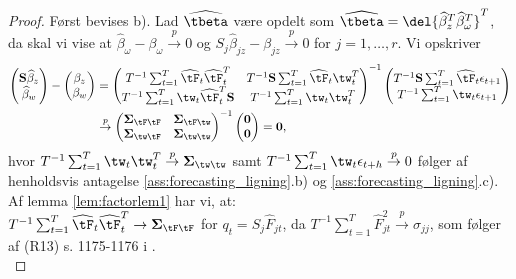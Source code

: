 \begin{proof}
Først bevises b). 
Lad \(\widehat{\tbeta}\) være opdelt som \(\widehat{\tbeta} = \del{\widehat{\beta}_z^T \widehat{\beta}_\omega^T}^T\), da skal vi vise at \(\widehat{\beta}_\omega - \beta_\omega \overset{p}{\rightarrow} 0\) og \(S_j \widehat{\beta}_{jz} - \beta_{jz} \overset{p}{\rightarrow} 0\) for \(j = 1, \ldots, r\).
Vi opskriver
\begin{align*}
\begin{pmatrix}
\mathbf{S} \widehat{\beta}_z \\ \widehat{\beta}_w
\end{pmatrix} - \begin{pmatrix}
\beta_z \\ \beta_w
\end{pmatrix} &= \begin{pmatrix}
T^{-1} \sum_{t=1}^T \widehat{\tF}_t \widehat{\tF}_t^T & T^{-1} \mathbf{S} \sum_{t=1}^T \widehat{\tF}_t \tw_t^T \\
T^{-1} \sum_{t=1}^T \tw_t \widehat{\tF}_t^T \mathbf{S} & T^{-1} \sum_{t=1}^T \tw_t \tw_t^T
\end{pmatrix}^{-1} \begin{pmatrix}
T^{-1} \mathbf{S} \sum_{t=1}^T \widehat{\tF}_t \epsilon_{t+1} \\
T^{-1} \sum_{t=1}^T \tw_t \epsilon_{t+1}
\end{pmatrix} \\
&\overset{p}{\rightarrow} \begin{pmatrix}
\boldsymbol{\Sigma}_{\tF \tF} & \boldsymbol{\Sigma}_{\tF \tw} \\ \boldsymbol{\Sigma}_{\tw \tF} & \boldsymbol{\Sigma}_{\tw \tw}   
\end{pmatrix}^{-1} \begin{pmatrix}
\mathbf{0} \\ \mathbf{0}
\end{pmatrix} = \mathbf{0},
\end{align*}
hvor 
\(T^{-1} \sum_{t=1}^T \tw_t \tw_t^T \overset{p}{\rightarrow} \boldsymbol{\Sigma}_{\tw \tw}\) samt \(T^{-1} \sum_{t=1}^T \tw_t \epsilon_{t+h} \overset{p}{\rightarrow} 0\) følger af henholdsvis antagelse \ref{ass:forecasting_ligning}.b) og \ref{ass:forecasting_ligning}.c).
Af lemma \ref{lem:factorlem1} har vi, at: \\
\(T^{-1} \sum_{t=1}^T \widehat{\tF}_t \widehat{\tF}_t^T \rightarrow \boldsymbol{\Sigma}_{\tF \tF}\) for \(q_t = S_j \widehat{F}_{jt}\), da \(T^{-1} \sum_{t=1}^T \widehat{F}_{jt}^2 \overset{p}{\rightarrow} \sigma_{jj}\), som følger af (R13) s. 1175-1176 i \citep{stock_watson_2002a}. \\

\end{proof}
